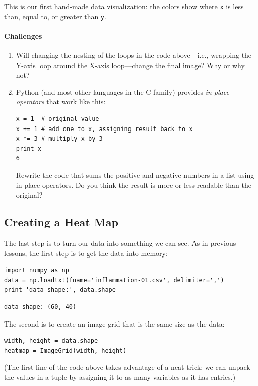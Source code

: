 \documentclass[]{book}
\newcommand{\gdef}[2]{\emph{#2}}
\begin{document}
This is our first hand-made data visualization: the colors show where
\texttt{x} is less than, equal to, or greater than \texttt{y}.

\mbox{}\paragraph{Challenges}

\begin{enumerate}
\item
  Will changing the nesting of the loops in the code above---i.e.,
  wrapping the Y-axis loop around the X-axis loop---change the final
  image? Why or why not?
\item
  Python (and most other languages in the C family) provides
  \gdef{g:in-place-operator}{in-place operators} that work like
  this:

\begin{verbatim}
x = 1  # original value
x += 1 # add one to x, assigning result back to x
x *= 3 # multiply x by 3
print x
6
\end{verbatim}

  Rewrite the code that sums the positive and negative numbers in a list
  using in-place operators. Do you think the result is more or less
  readable than the original?
\end{enumerate}

\subsection{Creating a Heat Map}

The last step is to turn our data into something we can see. As in
previous lessons, the first step is to get the data into memory:

\begin{verbatim}
import numpy as np
data = np.loadtxt(fname='inflammation-01.csv', delimiter=',')
print 'data shape:', data.shape
\end{verbatim}

\begin{verbatim}
data shape: (60, 40)
\end{verbatim}

The second is to create an image grid that is the same size as the data:

\begin{verbatim}
width, height = data.shape
heatmap = ImageGrid(width, height)
\end{verbatim}

(The first line of the code above takes advantage of a neat trick: we
can unpack the values in a tuple by assigning it to as many variables as
it has entries.)
\end{document}
